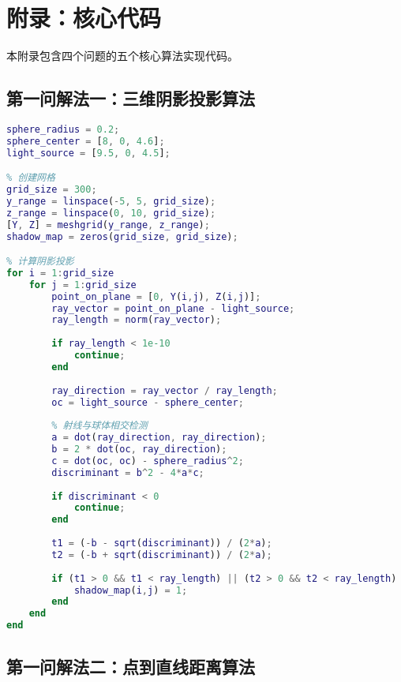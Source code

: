 \section{附录：核心代码}

本附录包含四个问题的五个核心算法实现代码。

\subsection{第一问解法一：三维阴影投影算法}

\begin{lstlisting}[language=Matlab,caption={第一问解法一：三维阴影投影核心代码}]
% 球体和光源参数
sphere_radius = 0.2;
sphere_center = [8, 0, 4.6];
light_source = [9.5, 0, 4.5];

% 创建网格
grid_size = 300;
y_range = linspace(-5, 5, grid_size);
z_range = linspace(0, 10, grid_size);
[Y, Z] = meshgrid(y_range, z_range);
shadow_map = zeros(grid_size, grid_size);

% 计算阴影投影
for i = 1:grid_size
    for j = 1:grid_size
        point_on_plane = [0, Y(i,j), Z(i,j)];
        ray_vector = point_on_plane - light_source;
        ray_length = norm(ray_vector);
        
        if ray_length < 1e-10
            continue;
        end
        
        ray_direction = ray_vector / ray_length;
        oc = light_source - sphere_center;
        
        % 射线与球体相交检测
        a = dot(ray_direction, ray_direction);
        b = 2 * dot(oc, ray_direction);
        c = dot(oc, oc) - sphere_radius^2;
        discriminant = b^2 - 4*a*c;
        
        if discriminant < 0
            continue;
        end
        
        t1 = (-b - sqrt(discriminant)) / (2*a);
        t2 = (-b + sqrt(discriminant)) / (2*a);
        
        if (t1 > 0 && t1 < ray_length) || (t2 > 0 && t2 < ray_length)
            shadow_map(i,j) = 1;
        end
    end
end
\end{lstlisting}

\subsection{第一问解法二：点到直线距离算法}

